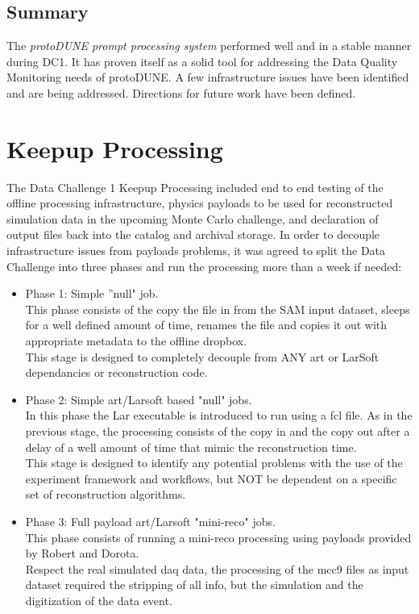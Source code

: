 \documentclass[pdftex,12pt,letter]{article}
\newcommand{\pd}{protoDUNE\xspace}
\begin{document}
\subsection{Summary}
The \textit{ \pd prompt processing system} performed well and in a stable manner during DC1. It has proven itself as a solid tool for addressing the Data Quality Monitoring needs
of \pd. A few infrastructure issues have been identified and are being addressed.
Directions for future work have been defined.
 


\section {Keepup Processing}

The Data Challenge 1 Keepup Processing  included end to end testing of the offline processing infrastructure, physics payloads to be used for reconstructed simulation data in the upcoming Monte Carlo challenge, and declaration of output files back into the catalog and archival storage.  
In order to decouple infrastructure issues from  payloads problems, it was agreed to split the Data Challenge into three phases and run the processing more than a week if needed:
\begin {itemize}

\item Phase 1: Simple  ''null" job.\\
 This phase consists of the copy the file in  from the SAM input dataset, sleeps for a well defined amount of time, renames the file and copies it out with appropriate metadata to the offline dropbox.\\
This stage is designed to completely decouple from ANY art or LarSoft dependancies or reconstruction code. 


\item Phase 2: Simple art/Larsoft based "null" jobs.\\
 In this phase the Lar executable is introduced to run using a fcl file. As in the previous stage, the processing consists of the copy in and the copy out after a delay of a well amount of time that mimic the reconstruction time. \\
 This stage is designed to identify any potential problems with the use of the experiment framework and workflows, but NOT be dependent on a specific set of reconstruction algorithms.  


\item Phase 3: Full payload art/Larsoft "mini-reco" jobs.\\
 This phase consists of running  a mini-reco processing using payloads provided by Robert and Dorota. \\
 Respect the real simulated daq  data, the processing of the mcc9 files as input dataset required the stripping of all info, but the simulation and the digitization of the data event.

\end{itemize}
\end{document}
